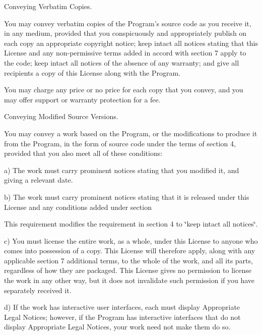 \begin{DoxyEnumerate}
\item Conveying Verbatim Copies.
\end{DoxyEnumerate}

You may convey verbatim copies of the Program's source code as you receive it, in any medium, provided that you conspicuously and appropriately publish on each copy an appropriate copyright notice; keep intact all notices stating that this License and any non-\/permissive terms added in accord with section 7 apply to the code; keep intact all notices of the absence of any warranty; and give all recipients a copy of this License along with the Program.

You may charge any price or no price for each copy that you convey, and you may offer support or warranty protection for a fee.


\begin{DoxyEnumerate}
\item Conveying Modified Source Versions.
\end{DoxyEnumerate}

You may convey a work based on the Program, or the modifications to produce it from the Program, in the form of source code under the terms of section 4, provided that you also meet all of these conditions\-:

a) The work must carry prominent notices stating that you modified it, and giving a relevant date.

b) The work must carry prominent notices stating that it is released under this License and any conditions added under section
\begin{DoxyEnumerate}
\item This requirement modifies the requirement in section 4 to \char`\"{}keep intact all notices\char`\"{}.
\end{DoxyEnumerate}

c) You must license the entire work, as a whole, under this License to anyone who comes into possession of a copy. This License will therefore apply, along with any applicable section 7 additional terms, to the whole of the work, and all its parts, regardless of how they are packaged. This License gives no permission to license the work in any other way, but it does not invalidate such permission if you have separately received it.

d) If the work has interactive user interfaces, each must display Appropriate Legal Notices; however, if the Program has interactive interfaces that do not display Appropriate Legal Notices, your work need not make them do so.

